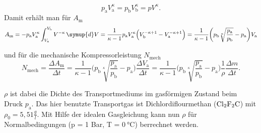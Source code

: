 \begin{equation}
p_\text{a}V^\kappa_\text{a} = p_\text{b}V^\kappa_\text{b} = pV^\kappa.
\label{eqn:poisson}
\end{equation}
Damit erhält man für $A_\text{m}$
\begin{equation}
A_\text{m} = - p_\text{a}V^\kappa_\text{a}\int_{V_\text{a}}^{V_\text{b}} V^{-\kappa} \, \symup{d}V = \frac{1}{\kappa-1}p_\text{a}V^\kappa_\text{a}\Bigl(V^{-\kappa+1}_\text{b}-V^{-\kappa+1}_\text{a}\Bigr) = \frac{1}{\kappa-1}\biggl(p_\text{b}\sqrt[\kappa]{\frac{p_\text{a}}{p_\text{b}}} - p_\text{a}\biggr) V_\text{a}
\label{eqn:A_m}
\end{equation}

und für die mechanische Kompressorleistung $N_\text{mech}$
\begin{equation}
N_\text{mech} = \frac{\Delta A_\text{m}}{\Delta t} = \frac{1}{\kappa-1}\biggl(p_\text{b}\sqrt[\kappa]{\frac{p_\text{a}}{p_\text{b}}} - p_\text{a}\biggr) \frac{\Delta V_\text{a}}{\Delta t} = \frac{1}{\kappa-1}\biggl(p_\text{b}\sqrt[\kappa]{\frac{p_\text{a}}{p_\text{b}}} - p_\text{a}\biggr) \frac{1}{\rho} \frac{\Delta m}{\Delta t}.
\label{eqn:nmech2}
\end{equation}

$\rho$ ist dabei die Dichte des Transportmediums im gasförmigen Zustand beim Druck $p_\text{a}$.
Das hier benutzte Transportgas ist Dichlordiflourmethan ($\ce{Cl2F2C}$) mit $\rho_0 = 5,51\frac{g}{l}$. 
Mit Hilfe der idealen Gasgleichung kann nun $\rho$ für Normalbedingungen (p = 1 Bar, T = $\SI{0}{\celsius}$) berrechnet werden.


